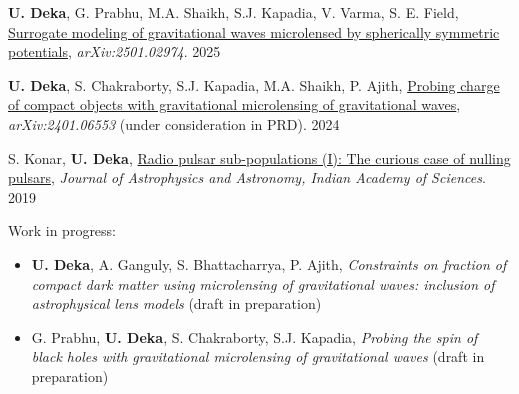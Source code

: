 \begin{itemize}[noitemsep]
    {
    \item\textbf{U. Deka}, G. Prabhu, M.A. Shaikh, S.J. Kapadia, V. Varma, S. E. Field, \href{https://arxiv.org/abs/2501.02974}{Surrogate modeling of gravitational waves microlensed by spherically symmetric potentials}, \textit{arXiv:2501.02974}. \hfill 2025
    \item \textbf{U. Deka}, S. Chakraborty, S.J. Kapadia, M.A. Shaikh, P. Ajith, \href{https://arxiv.org/pdf/2401.06553}{Probing charge of compact objects with gravitational microlensing of gravitational waves}, \textit{arXiv:2401.06553} (under consideration in PRD). \hfill  2024
        
    \item S. Konar, \textbf{U. Deka}, \href{https://www.ias.ac.in/article/fulltext/joaa/040/05/0042}{Radio pulsar sub-populations (I): The curious case of nulling pulsars}, \textit{Journal of Astrophysics and Astronomy, Indian Academy of Sciences}. \hfill 2019
    
    \item Work in progress:
        \begin{itemize}
        \item\textbf{U. Deka}, A. Ganguly, S. Bhattacharrya, P. Ajith, \textit{Constraints on fraction of compact dark matter using microlensing of gravitational waves: inclusion of astrophysical lens models} (draft in preparation)
        \item G. Prabhu, \textbf{U. Deka}, S. Chakraborty, S.J. Kapadia, \textit{Probing the spin of black holes with gravitational microlensing of gravitational waves} (draft in preparation)
        \end{itemize}
    }
\end{itemize}